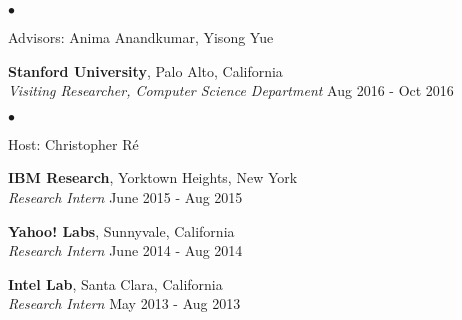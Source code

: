 \documentclass[margin,line]{res}
\newenvironment{list1}{
  \begin{list}{\ding{113}}{%
      \setlength{\itemsep}{0in}
      \setlength{\parsep}{0in} \setlength{\parskip}{0in}
      \setlength{\topsep}{0in} \setlength{\partopsep}{0in} 
      \setlength{\leftmargin}{0.17in}}}{\end{list}}
\newenvironment{list2}{
  \begin{list}{$\bullet$}{%
      \setlength{\itemsep}{0in}
      \setlength{\parsep}{0in} \setlength{\parskip}{0in}
      \setlength{\topsep}{0in} \setlength{\partopsep}{0in} 
      \setlength{\leftmargin}{0.2in}}}{\end{list}}
\begin{document}
\begin{resume}
\begin{list2}
\item Advisors:  Anima Anandkumar, Yisong Yue
\end{list2}


{\bf Stanford University}, Palo Alto, California\\
{\em Visiting Researcher,  Computer Science Department} \hfill { Aug 2016 - Oct 2016}

\begin{list2}
\item Host:  Christopher R\'e
\end{list2}

{\bf  IBM  Research}, Yorktown Heights, New York\\
\vspace{-.2cm}
{\em Research Intern} \hfill {June 2015 - Aug 2015}


{\bf  Yahoo! Labs}, Sunnyvale, California\\
\vspace{-.2cm}
{\em Research Intern} \hfill { June 2014 - Aug 2014} 
%


{\bf  Intel Lab}, Santa Clara, California\\
\vspace{-.2cm}
{\em Research Intern} \hfill{May 2013 - Aug 2013}


\end{resume}
\end{document}
